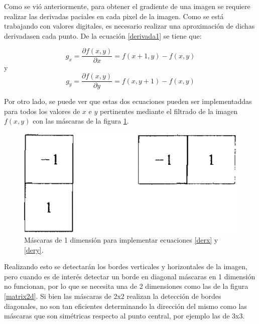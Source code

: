 Como se vió anteriormente, para obtener el gradiente de una imagen se requiere realizar las derivadas paciales en cada pixel de la imagen. Como se está trabajando con valores digitales, es necesario realizar una aproximación de dichas derivadasen cada punto. De la ecuación \ref{derivada1} se tiene que:

\begin{equation}
g_x = \frac{{\partial}f(x,y)}{{\partial}x} = f(x+1,y) - f(x,y)
\label{derx}
\end{equation}
y
\begin{equation}
g_y = \frac{{\partial}f(x,y)}{{\partial}y} = f(x,y+1) - f(x,y)
\label{dery}
\end{equation}

Por otro lado, se puede ver que estas dos ecuaciones pueden ser implementaddas para todos los valores de $x$ e $y$ pertinentes mediante el filtrado de la imagen $f(x,y)$ con las máscaras de la figura \ref{matrix1d}.

\begin{figure}[H]
\begin{center}
\includegraphics[scale=0.3]{img/matriz1d.png}
\end{center}
\caption{Máscaras de 1 dimensión para implementar ecuaciones \ref{derx} y \ref{dery}.}
\label{matrix1d}
\end{figure}

Realizando esto se detectarán los bordes verticales y horizontales de la imagen, pero cuando es de interés detectar un borde en diagonal máscaras en 1 dimensión no funcionan, por lo que se necesita una de 2 dimensiones como las de la figura \ref{matrix2d}. Si bien las máscaras de 2x2 realizan la detección de bordes diagonales, no son tan eficientes determinando la dirección del mismo como las máscaras que son simétricas respecto al punto central, por ejemplo las de 3x3.

